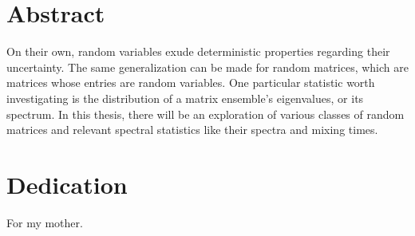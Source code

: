 \documentclass[12pt,twoside]{reedthesis}
\begin{document}

    \chapter*{Abstract}
	On their own, random variables exude deterministic properties regarding their uncertainty. The same generalization can be made for random matrices, which are matrices whose entries are random variables. One particular statistic worth investigating is the distribution of a matrix ensemble's eigenvalues, or its spectrum. In this thesis, there will be an exploration of various classes of random matrices and relevant spectral statistics like their spectra and mixing times.

	\chapter*{Dedication}
	For my mother.

  \mainmatter %
  \pagestyle{fancyplain} %









    \appendix
      
      
      
      


  \backmatter %

    \nocite{*}


%
 

\end{document}
